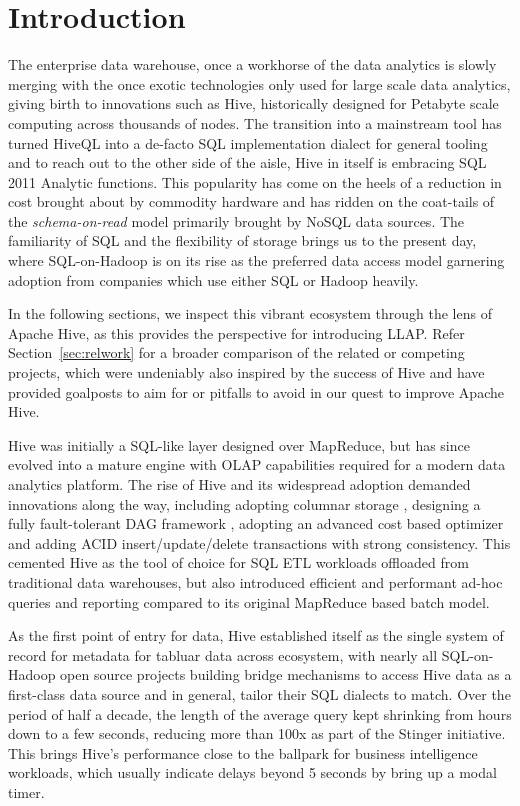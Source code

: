 

\section{Introduction}

The enterprise data warehouse, once a workhorse of the data analytics is slowly merging with the once exotic technologies only used for large scale data analytics, giving birth to innovations such as Hive, historically designed for Petabyte scale computing across thousands of nodes. 
The transition into a mainstream tool has turned HiveQL into a de-facto SQL implementation dialect for general tooling and to reach out to the other side of the aisle, Hive in itself is embracing SQL 2011 Analytic functions.  
This popularity has come on the heels of a reduction in cost brought about by commodity hardware and has ridden on the coat-tails of the \emph{schema-on-read} model primarily brought by NoSQL data sources. 
The familiarity of SQL and the flexibility of storage brings us to the present day, where SQL-on-Hadoop is on its rise as the preferred data access model garnering adoption from companies which use either SQL or Hadoop heavily.  

In the following sections, we inspect this vibrant ecosystem through the lens of Apache Hive, as this provides the perspective for introducing LLAP. Refer Section~\ref{sec:relwork} for a broader comparison of the related or competing projects, which were undeniably also inspired by the success of Hive and have provided goalposts to aim for or pitfalls to avoid in our quest to improve Apache Hive. 

Hive was initially a SQL-like layer designed over MapReduce, but has since evolved into a mature engine with OLAP capabilities required for a modern data analytics platform.
The rise of Hive and its widespread adoption demanded innovations along the way, including adopting columnar storage \cite{Apache ORC}, designing a fully fault-tolerant DAG framework \cite{Apache Tez}, adopting an advanced cost based optimizer \cite{Apache Calcite} and adding ACID insert/update/delete transactions with strong consistency. This cemented Hive as the tool of choice for SQL ETL workloads offloaded from traditional data warehouses, but also introduced efficient and performant ad-hoc queries and reporting compared to its original MapReduce based batch model.

As the first point of entry for data, Hive established itself as the single system of record for metadata for tabluar data across ecosystem, with nearly all SQL-on-Hadoop open source projects building bridge mechanisms to access Hive data as a first-class data source and in general, tailor their SQL dialects to match. 
Over the period of half a decade, the length of the average query kept shrinking from hours down to a few seconds, reducing more than 100x as part of the Stinger\cite{tez} initiative. This brings Hive's performance close to the ballpark for business intelligence workloads, which usually indicate delays beyond 5 seconds by bring up a modal timer.

